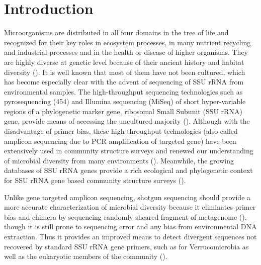 \documentclass[12pt]{article}
\begin{document}
\section{Introduction}
  Microorganisms are distributed in all four domains in the tree of life and recognized for their key roles in ecosystem processes, in many nutrient recycling and industrial processes and in the health or disease of higher organisms. They are highly diverse at genetic level because of their ancient history and habitat diversity (\cite{ward2002}). It is well known that most of them have not been cultured, which has become especially clear with the advent of sequencing of SSU rRNA from environmental samples. The high-throughput sequencing technologies such as pyrosequencing (454) and Illumina sequencing (MiSeq) of short hyper-variable regions of a phylogenetic marker gene, ribosomal Small Subunit (SSU rRNA) gene, provide means of accessing the uncultured majority (\cite{streit2004}). Although with the disadvantage of primer bias, these high-throughput technologies (also called amplicon sequencing due to PCR amplification of targeted gene) have been extensively used in community structure surveys and renewed our understanding of microbial diversity from many environments (\cite{huse2008,caporaso2012miseq}). Meanwhile, the growing databases of SSU rRNA genes provide a rich ecological and phylogenetic context for SSU rRNA gene based community structure surveys (\cite{rdp2009,silva2013}).

  Unlike gene targeted amplicon sequencing, shotgun sequencing should provide a more accurate characterization of microbial diversity because it eliminates primer bias and chimera by sequencing randomly sheared fragment of metagenome (\cite{chimeraslayer}), though it is still prone to sequencing error and any bias from environmental DNA extraction. Thus it provides an improved means to detect divergent sequences not recovered by standard SSU rRNA gene primers, such as for Verrucomicrobia as well as the eukaryotic members of the community (\cite{baker2003,primereva2008,verruco2011}).
\end{document}
